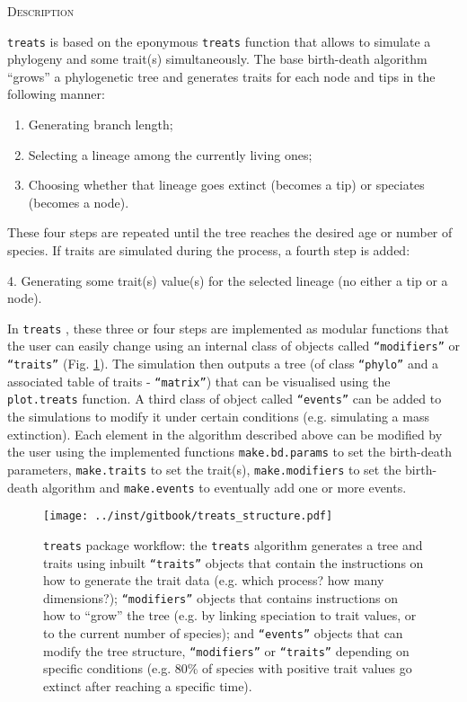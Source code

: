 \documentclass[12pt,letterpaper]{article}
\renewcommand{\section}[1]{%
\bigskip
\begin{center}
\begin{Large}
\normalfont\scshape #1
\medskip
\end{Large}
\end{center}}
\newcommand{\treats}{\texttt{treats} }
\begin{document}
\section{Description}
\treats is based on the eponymous \treats function that allows to simulate a phylogeny and some trait(s) simultaneously.
The base birth-death algorithm ``grows'' a phylogenetic tree and generates traits for each node and tips in the following manner:

\begin{enumerate}
    \item Generating branch length;
    \item Selecting a lineage among the currently living ones;
    \item Choosing whether that lineage goes extinct (becomes a tip) or speciates (becomes a node).
\end{enumerate}

These four steps are repeated until the tree reaches the desired age or number of species.
If traits are simulated during the process, a fourth step is added:

    4. Generating some trait(s) value(s) for the selected lineage (no either a tip or a node).

In \treats, these three or four steps are implemented as modular functions that the user can easily change using an internal class of objects called \texttt{``modifiers''} or \texttt{``traits''} (Fig. \ref{Fig:workflow}).
The simulation then outputs a tree (of class \texttt{``phylo''} and a associated table of traits - \texttt{``matrix''}) that can be visualised using the \texttt{plot.treats} function.
A third class of object called \texttt{``events''} can be added to the simulations to modify it under certain conditions (e.g. simulating a mass extinction).
Each element in the algorithm described above can be modified by the user using the implemented functions \texttt{make.bd.params} to set the birth-death parameters, \texttt{make.traits} to set the trait(s), \texttt{make.modifiers} to set the birth-death algorithm and \texttt{make.events} to eventually add one or more events.

\begin{figure}[!htbp]
\centering
   \texttt{[image: ../inst/gitbook/treats\_structure.pdf]} 
\caption{\treats package workflow: the \treats algorithm generates a tree and traits using inbuilt \texttt{``traits''} objects that contain the instructions on how to generate the trait data (e.g. which process? how many dimensions?); \texttt{``modifiers''} objects that contains instructions on how to ``grow'' the tree (e.g. by linking speciation to trait values, or to the current number of species); and \texttt{``events''} objects that can modify the tree structure, \texttt{``modifiers''} or \texttt{``traits''} depending on specific conditions (e.g. 80\% of species with positive trait values go extinct after reaching a specific time).}
\label{Fig:workflow}
\end{figure}
\end{document}
